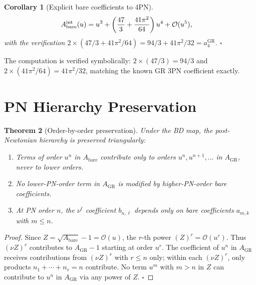 \documentclass[11pt,a4paper]{article}
\theoremstyle{plain}
\newtheorem{theorem}{Theorem}[section]
\newtheorem{corollary}[theorem]{Corollary}
\theoremstyle{definition}
\theoremstyle{remark}
\newcommand{\GR}{\mathrm{GR}}
\newcommand{\bare}{\mathrm{bare}}
\begin{document}
\begin{corollary}[Explicit bare coefficients to 4PN]
\label{cor:bare_coeffs}
\begin{align}
  A_\bare^{\rm int}(u) &= u^3
    + \left(\frac{47}{3} + \frac{41\pi^2}{64}\right)u^4
    + \mathcal{O}(u^5), \label{eq:bare_explicit}
\end{align}
with the verification $2\times(47/3+41\pi^2/64) = 94/3+41\pi^2/32 = a_4^\GR$. $\square$
\end{corollary}

The computation is verified symbolically: $2\times(47/3) = 94/3$ and
$2\times(41\pi^2/64) = 41\pi^2/32$, matching the known GR 3PN coefficient exactly.

\section{PN Hierarchy Preservation}
\label{sec:hierarchy}

\begin{theorem}[Order-by-order preservation]
\label{thm:hierarchy}
Under the BD map, the post-Newtonian hierarchy is preserved triangularly:
\begin{enumerate}[nosep,label=\rm(\roman*)]
  \item Terms of order $u^n$ in $A_\bare$ contribute only to orders $u^n,
    u^{n+1}, \ldots$ in $A_\GR$, never to lower orders.
  \item No lower-PN-order term in $A_\GR$ is modified by higher-PN-order bare
    coefficients.
  \item At PN order $n$, the $\nu^\ell$ coefficient $b_{n,\ell}$ depends only
    on bare coefficients $a_{m,k}$ with $m \leq n$.
\end{enumerate}
\end{theorem}

\begin{proof}
Since $Z = \sqrt{A_\bare} - 1 = \mathcal{O}(u)$, the $r$-th power $(Z)^r = \mathcal{O}(u^r)$.
Thus $(\nu Z)^r$ contributes to $A_\GR - 1$ starting at order $u^r$.  The coefficient
of $u^n$ in $A_\GR$ receives contributions from $(\nu Z)^r$ with $r \leq n$ only;
within each $(\nu Z)^r$, only products $n_1+\cdots+n_r = n$ contribute.  No term
$u^m$ with $m > n$ in $Z$ can contribute to $u^n$ in $A_\GR$ via any power of $Z$.
\qquad $\square$
\end{proof}
\end{document}
